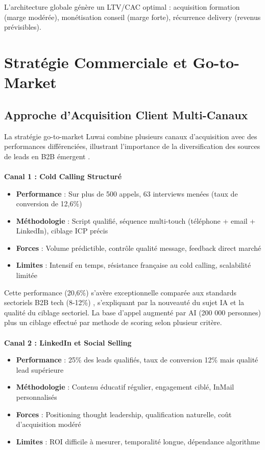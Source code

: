 L'architecture globale génère un LTV/CAC optimal : acquisition formation (marge modérée), monétisation conseil (marge forte), récurrence delivery (revenus prévisibles).

\section{Stratégie Commerciale et Go-to-Market}

\subsection{Approche d'Acquisition Client Multi-Canaux}

La stratégie go-to-market Luwai combine plusieurs canaux d'acquisition avec des performances différenciées, illustrant l'importance de la diversification des sources de leads en B2B émergent \cite{weinberg2015traction}.
\\\\
\textbf{Canal 1 : Cold Calling Structuré}
\begin{itemize}
    \item \textbf{Performance} : Sur plus de 500 appels, 63 interviews menées (taux de conversion de 12,6\%)
    \item \textbf{Méthodologie} : Script qualifié, séquence multi-touch (téléphone + email + LinkedIn), ciblage ICP précis
    \item \textbf{Forces} : Volume prédictible, contrôle qualité message, feedback direct marché
    \item \textbf{Limites} : Intensif en temps, résistance française au cold calling, scalabilité limitée
\end{itemize}
\medskip
Cette performance (20,6\%) s'avère exceptionnelle comparée aux standards sectoriels B2B tech (8-12\%) \cite{salesforce2024benchmarks}, s'expliquant par la nouveauté du sujet IA et la qualité du ciblage sectoriel. La base d'appel augmenté par AI (200 000 personnes) plus un ciblage effectué par methode de scoring selon plusieur critère.
\\\\
\textbf{Canal 2 : LinkedIn et Social Selling}
\begin{itemize}
    \item \textbf{Performance} : 25\% des leads qualifiés, taux de conversion 12\% mais qualité lead supérieure
    \item \textbf{Méthodologie} : Contenu éducatif régulier, engagement ciblé, InMail personnalisés
    \item \textbf{Forces} : Positioning thought leadership, qualification naturelle, coût d'acquisition modéré
    \item \textbf{Limites} : ROI difficile à mesurer, temporalité longue, dépendance algorithme
\end{itemize}
